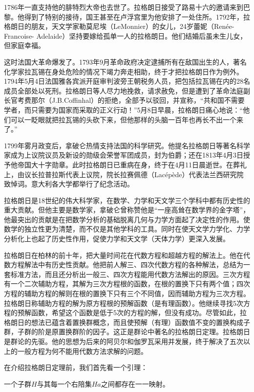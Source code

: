 \documentclass{article}
\begin{document}
1786年一直支持他的腓特烈大帝也去世了。拉格朗日接受了路易十六的邀请来到巴黎。他得到了特别的接待，国王甚至在卢浮宫里为他安排了一处住所。1792年，拉格朗日的朋友，天文学家勒莫尼埃（LeMonnier）的女儿，24岁蕾妮（Renée-Francoise- Adelaide）坚持要嫁给孤单一人的拉格朗日。他们结婚后虽未生儿女，但家庭幸福。

这时法国大革命爆发了。1793年9月革命政府决定逮捕所有在敌国出生的人，著名化学家拉瓦锡在身处危险的情况下竭力奔走相助，终于才把拉格朗日作为例外。1794年5月4日法国雅各宾派开庭审判波旁王朝税务人员，把包括拉瓦锡在内的28名成员全部处以死刑。拉格朗日等人尽力地挽救，请求赦免，但是遭到了革命法庭副长官考费那尔（J.B.Coffinhal）的拒绝，全部予以驳回，并宣称，“共和国不需要学者，而只需要为国家而采取的正义行动！”5月8日早晨，拉格朗日痛心地说：“他们可以一眨眼就把拉瓦锡的头砍下来，但他那样的头脑一百年也再长不出一个来了。”\cite{Wiki-Lagrange}

1799年雾月政变后，拿破仑热情支持法国的科学研究。他提名拉格朗日等著名科学家成为上议院议员及新设的勋级会荣誉军团成员，封为伯爵；还在1813年4月3日授予他帝国大十字勋章。此时拉格朗日已重病在身，终于在4月11日晨逝世。在葬礼上，由议长拉普拉斯代表上议院，院长拉赛佩德（Lacépède）代表法兰西研究院致悼词。意大利各大学都举行了纪念活动。

拉格朗日是18世纪的伟大科学家，在数学、力学和天文学三个学科中都有历史性的重大贡献。但他主要是数学家，拿破仑曾称赞他是“一座高耸在数学界的金字塔”，他最突出的贡献是在把数学分析的基础脱离几何与力学方面起了决定性的作用。使数学的独立性更为清楚，而不仅是其他学科的工具。同时在使天文学力学化、力学分析化上也起了历史性作用，促使力学和天文学（天体力学）更深入发展。

拉格朗日在柏林的前十年，把大量时间花在代数方程和超越方程的解法上。他在代数方程解法中有历史性贡献。他把前人解三、四次代数方程的各种解法，总结为一套标准方法，而且还分析出一般三、四次方程能用代数方法解出的原因。三次方程有一个二次辅助方程，其解为三次方程根的函数，在根的置换下只有两个值；四次方程的辅助方程的解则在根的置换下只有三个不同值，因而辅助方程为三次方程。拉格朗日称辅助方程的解为原方程根的预解函数（是有理函数）。他继续寻找5次方程的预解函数，希望这个函数是低于5次的方程的解，但没有成功。尽管如此，拉格朗日的想法已蕴含着置换群概念，而且使预解（有理）函数值不变的置换构成子群，子群的阶是原置换群阶的因子。这正是群论中著名的拉格朗日定理。拉格朗日是群论的先驱。他的思想为后来的阿贝尔和伽罗瓦采用并发展，终于解决了五次以上的一般方程为何不能用代数方法求解的问题。

在介绍拉格朗日定理前，我们首先看一个引理：

\begin{lemma}
一个子群$H$与其每一个右陪集$Ha$之间都存在一一映射。
\end{lemma}
\end{document}
